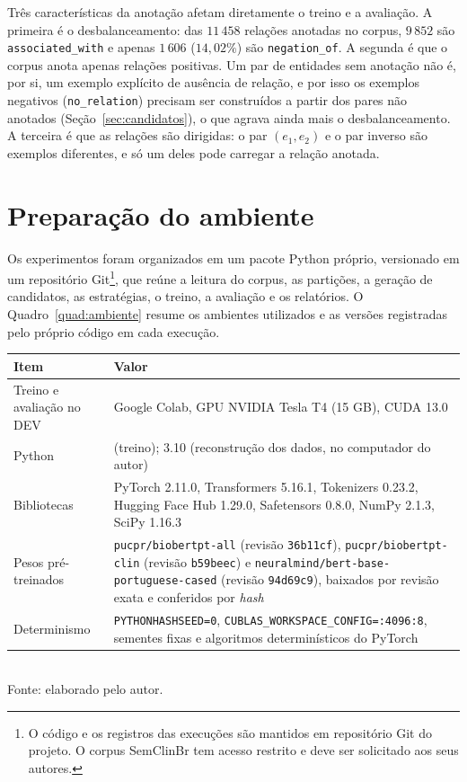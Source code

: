 Três características da anotação afetam diretamente o treino e a avaliação. A
primeira é o desbalanceamento: das $11\,458$ relações anotadas no corpus,
$9\,852$ são \texttt{associated\_with} e apenas $1\,606$ ($14{,}02\%$) são
\texttt{negation\_of}. A segunda é que o corpus anota apenas relações
positivas. Um par de entidades sem anotação não é, por si, um exemplo explícito de
ausência de relação, e por isso os exemplos negativos (\texttt{no\_relation}) precisam
ser construídos a partir dos pares não anotados (Seção~\ref{sec:candidatos}), o que
agrava ainda mais o desbalanceamento. A terceira é que as relações são
dirigidas: o par $(e_1, e_2)$ e o par inverso são exemplos diferentes, e só um deles
pode carregar a relação anotada.

\section{Preparação do ambiente}
\label{sec:ambiente}

Os experimentos foram organizados em um pacote Python próprio, versionado em um
repositório Git\footnote{O código e os registros das execuções são mantidos em repositório Git do projeto. O corpus SemClinBr tem acesso restrito e deve ser solicitado aos seus autores.}, que reúne a leitura do corpus, as partições, a geração de
candidatos, as estratégias, o treino, a avaliação e os relatórios. O
Quadro~\ref{quad:ambiente} resume os ambientes utilizados e as versões registradas
pelo próprio código em cada execução.

\begin{quadro}[htbp]
  \centering
  \caption{Ambientes de execução e versões das principais bibliotecas.}
  \label{quad:ambiente}
  \small
  \begin{tabular}{l >{\raggedright\arraybackslash}p{9.4cm}}
  \toprule
  Item & Valor \\
  \midrule
  Treino e avaliação no DEV & Google Colab, GPU NVIDIA Tesla T4 (15 GB), CUDA 13.0 \\
  Python & 3.13 (treino); 3.10 (reconstrução dos dados, no computador do autor) \\
  Bibliotecas & PyTorch 2.11.0, Transformers 5.16.1, Tokenizers 0.23.2, Hugging Face Hub 1.29.0, Safetensors 0.8.0, NumPy 2.1.3, SciPy 1.16.3 \\
  Pesos pré-treinados & \texttt{pucpr/biobertpt-all} (revisão \texttt{36b11cf}), \texttt{pucpr/biobertpt-clin} (revisão \texttt{b59beec}) e \texttt{neuralmind/\allowbreak bert-base-portuguese-cased} (revisão \texttt{94d69c9}), baixados por revisão exata e conferidos por \emph{hash} \\
  Determinismo & \texttt{PYTHONHASHSEED=0}, \texttt{CUBLAS\_WORKSPACE\_CONFIG=:4096:8}, sementes fixas e algoritmos determinísticos do PyTorch \\
  \bottomrule
  \end{tabular}\\[4pt]
  {\footnotesize Fonte: elaborado pelo autor.}
\end{quadro}

